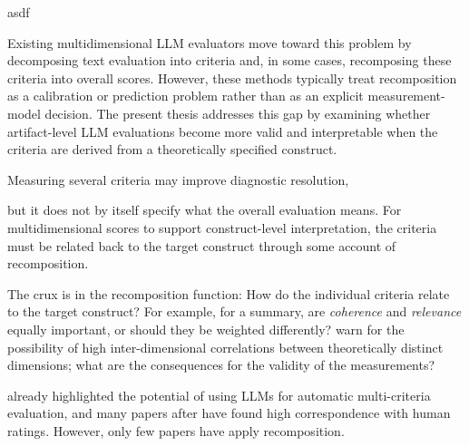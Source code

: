 

asdf












Existing multidimensional LLM evaluators move toward this problem by decomposing text evaluation into criteria and, in some cases, recomposing these criteria into overall scores. However, these methods typically treat recomposition as a calibration or prediction problem rather than as an explicit measurement-model decision. The present thesis addresses this gap by examining whether artifact-level LLM evaluations become more valid and interpretable when the criteria are derived from a theoretically specified construct.

Measuring several criteria may improve diagnostic resolution, 

but it does not by itself specify what the overall evaluation means. For multidimensional scores to support construct-level interpretation, the criteria must be related back to the target construct through some account of recomposition.

The crux is in the recomposition function: How do the individual criteria relate to the target construct? For example, for a summary, are \textit{coherence} and \textit{relevance} equally important, or should they be weighted differently? \citet{xiaoEvaluatingEvaluationMetrics2023} warn for the possibility of high inter-dimensional correlations between theoretically distinct dimensions; what are the consequences for the validity of the measurements?

\citet{liu_g-eval_2023} already highlighted the potential of using LLMs for automatic multi-criteria evaluation, and many papers after have found high correspondence with human ratings. However, only few papers have apply recomposition. 


